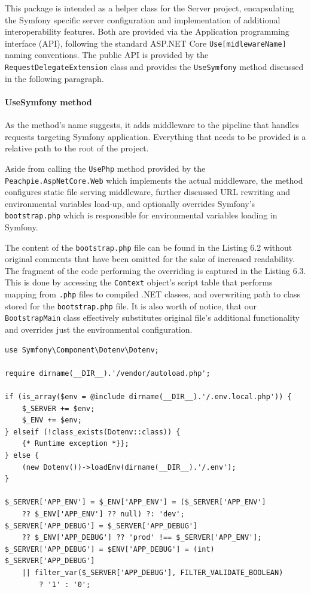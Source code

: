 This package is intended as a helper class for the Server project, encapsulating the Symfony specific server configuration and implementation of additional interoperability features. Both are provided via the Application programming interface (API), following the standard ASP.NET Core \texttt{Use[midlewareName]} naming conventions. The public API is provided by the \texttt{RequestDelegateExtension} class and provides the \texttt{UseSymfony} method discussed in the following paragraph.

\paragraph{UseSymfony method} As the method's name suggests, it adds middleware to the pipeline that handles requests targeting Symfony application. Everything that needs to be provided is a relative path to the root of the project.

Aside from calling the \texttt{UsePhp} method provided by the \texttt{Peachpie.AspNetCore.Web} which implements the actual middleware, the method configures static file serving middleware, further discussed URL rewriting and environmental variables load-up, and optionally overrides Symfony's \texttt{bootstrap.php} which is responsible for environmental variables loading in Symfony.

The content of the \texttt{bootstrap.php} file can be found in the Listing 6.2 without original comments that have been omitted for the sake of increased readability. The fragment of the code performing the overriding is captured in the Listing 6.3. This is done by accessing the \texttt{Context} object's script table that performs mapping from \texttt{.php} files to compiled .NET classes, and overwriting path to class stored for the \texttt{bootstrap.php} file. It is also worth of notice, that our \texttt{BootstrapMain} class effectively substitutes original file's additional functionality and overrides just the environmental configuration.

\begin{center}
\begin{lstlisting}[caption={bootstrap.php},captionpos=b]
use Symfony\Component\Dotenv\Dotenv;

require dirname(__DIR__).'/vendor/autoload.php';

if (is_array($env = @include dirname(__DIR__).'/.env.local.php')) {
	$_SERVER += $env;
	$_ENV += $env;
} elseif (!class_exists(Dotenv::class)) {
	{* Runtime exception *}};
} else {
	(new Dotenv())->loadEnv(dirname(__DIR__).'/.env');
}

$_SERVER['APP_ENV'] = $_ENV['APP_ENV'] = ($_SERVER['APP_ENV']
	?? $_ENV['APP_ENV'] ?? null) ?: 'dev';
$_SERVER['APP_DEBUG'] = $_SERVER['APP_DEBUG']
	?? $_ENV['APP_DEBUG'] ?? 'prod' !== $_SERVER['APP_ENV'];
$_SERVER['APP_DEBUG'] = $ENV['APP_DEBUG'] = (int) $_SERVER['APP_DEBUG']
	|| filter_var($_SERVER['APP_DEBUG'], FILTER_VALIDATE_BOOLEAN)
		? '1' : '0';
\end{lstlisting}
\end{center}	

